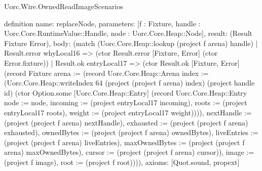 \begin{lexlean}{Uorc.Wire.OwnedReadImageScenarios}
\begin{semanticmodule}
definition{
  name: replaceNode,
  parameters: [f : Fixture, handle : Uorc.Core.RuntimeValue::Handle, node : Uorc.Core.Heap::Node],
  result: (Result Fixture Error),
  body: (match (Uorc.Core.Heap::lookup (project f arena) handle)
    | Result.error whyLocal16 => (ctor Result.error [Fixture, Error] (ctor Error.fixture))
    | Result.ok entryLocal17 => (ctor Result.ok [Fixture, Error] (record Fixture {arena := (record Uorc.Core.Heap::Arena {index := (Uorc.Core.Heap::writeIndex 64 (project (project f arena) index) (project handle id) (ctor Option.some [Uorc.Core.Heap::Entry] (record Uorc.Core.Heap::Entry {node := node, incoming := (project entryLocal17 incoming), roots := (project entryLocal17 roots), weight := (project entryLocal17 weight)}))), nextHandle := (project (project f arena) nextHandle), exhausted := (project (project f arena) exhausted), ownedBytes := (project (project f arena) ownedBytes), liveEntries := (project (project f arena) liveEntries), maxOwnedBytes := (project (project f arena) maxOwnedBytes), cursor := (project (project f arena) cursor)}), image := (project f image), root := (project f root)}))),
  axioms: [Quot.sound, propext]
}


\end{semanticmodule}
\end{lexlean}
